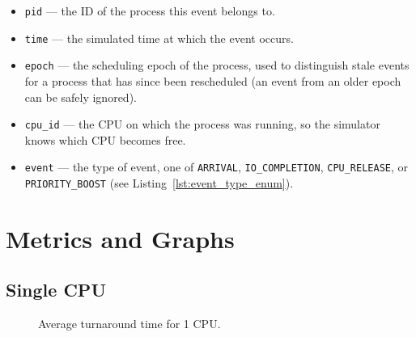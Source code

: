 \documentclass[12pt]{article}
\begin{document}
\begin{itemize}
    \item \texttt{pid} — the ID of the process this event belongs to.
    \item \texttt{time} — the simulated time at which the event occurs.
    \item \texttt{epoch} — the scheduling epoch of the process, used to distinguish stale events for a process that has since been rescheduled (an event from an older epoch can be safely ignored).
    \item \texttt{cpu\_id} — the CPU on which the process was running, so the simulator knows which CPU becomes free.
    \item \texttt{event} — the type of event, one of \texttt{ARRIVAL}, \texttt{IO\_COMPLETION}, \texttt{CPU\_RELEASE}, or \texttt{PRIORITY\_BOOST} (see Listing~\ref{lst:event_type_enum}).
\end{itemize}
\section{Metrics and Graphs}



\subsection{Single CPU}

\begin{figure}[htbp]
\centering
{}
\caption{Average turnaround time for 1 CPU.}
\label{fig:tat_cpu1}
\end{figure}
\end{document}
